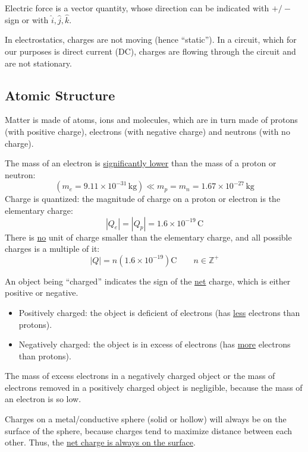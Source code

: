 \documentclass{article}
\newcommand{\definition}[1]{\begin{tcolorbox}[colback=red!5!white,colframe=red!75!black,parbox=false] #1 \end{tcolorbox}}
\newcommand{\theorem}[2]{\begin{tcolorbox}[title={#1},colback=blue!5!white,colframe=blue!75!black,parbox=false] #2 \end{tcolorbox}}
\newcommand{\remark}[2]{\begin{tcolorbox}[title={#1},colback=black!5!white,colframe=black!75!black,parbox=false] #2 \end{tcolorbox}}
\begin{document}
Electric force is a vector quantity, whose direction can be indicated with $+/-$ sign or with $\hat i,\hat j,\hat k$.

\remark{Electrostatics vs circuits}{
	In electrostatics, charges are not moving (hence ``static''). In a circuit, which for our purposes is direct current (DC), charges are flowing through the circuit and are not stationary.
}

\subsection{Atomic Structure}

Matter is made of atoms, ions and molecules, which are in turn made of protons (with positive charge), electrons (with negative charge) and neutrons (with no charge).

The mass of an electron is \ul{significantly lower} than the mass of a proton or neutron:
\begin{equation*}
	(m_e=9.11\times 10^{-31}\,\si{\kilo\gram})\ll m_p=m_n=1.67\times 10^{-27}\,\si{\kilo\gram}
\end{equation*}
Charge is quantized: the magnitude of charge on a proton or electron is the elementary charge:
\begin{equation*}
	\left|Q_e\right|=\left|Q_p\right|=1.6\times 10^{-19}\,\si{\coulomb}
\end{equation*}
There is \ul{no} unit of charge smaller than the elementary charge, and all possible charges is a multiple of it:
\begin{equation*}
	\left|Q\right|=n \left( 1.6\times 10^{-19} \right)\si{\coulomb} \qquad n\in\mathbb Z^+
\end{equation*}
\definition{An object being ``charged'' indicates the sign of the \ul{net} charge, which is either positive or negative.
\begin{itemize}
	\item Positively charged: the object is deficient of electrons (has \ul{less} electrons than protons).
	\item Negatively charged: the object is in excess of electrons (has \ul{more} electrons than protons).
\end{itemize}}
The mass of excess electrons in a negatively charged object or the mass of electrons removed in a positively charged object is negligible, because the mass of an electron is so low.

\theorem*{
	Charges on a metal/conductive sphere (solid or hollow) will always be on the surface of the sphere, because charges tend to maximize distance between each other. Thus, the \ul{net charge is always on the surface}.
}
\end{document}
